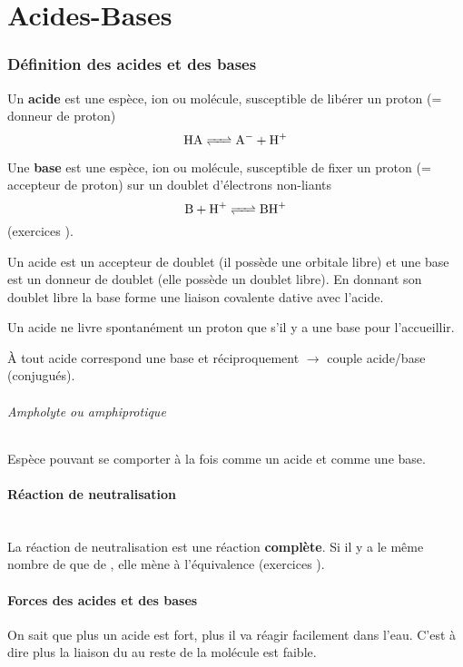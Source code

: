 \part{Acides-Bases}
\section{Définition des acides et des bases}

Un \textbf{acide} est une espèce,
ion ou molécule,
susceptible de libérer un proton  (= donneur de proton)
\[ \ce{HA <=> A- + H+} \]

Une \textbf{base} est une espèce, ion ou molécule,
susceptible de fixer un proton  (= accepteur de proton) sur un doublet d'électrons non-liants
\[ \ce{B + H+ <=> BH+} \]
(exercices \cite[p.~6]{godard}).

Un acide est un accepteur de doublet (il possède une orbitale libre) et une base est un donneur de doublet (elle possède un doublet libre).
En donnant son doublet libre la base forme une liaison covalente dative avec l'acide.

Un acide ne livre spontanément un proton que s'il y a une base pour l'accueillir.

À tout acide correspond une base et réciproquement $\rightarrow$ couple acide/base (conjugués).

\paragraph{Ampholyte ou amphiprotique}
Espèce pouvant se comporter à la fois comme un acide et comme une base.

\subsection{Réaction de neutralisation}

\\

La réaction de neutralisation est une réaction \textbf{complète}.
Si il y a le même nombre de  que de ,
elle mène à l'équivalence (exercices \cite[p.~4]{godard}).

\subsection{Forces des acides et des bases}
On sait que plus un acide est fort,
plus il va réagir facilement dans l'eau.
C'est à dire plus la liaison du  au reste de la molécule est faible.

